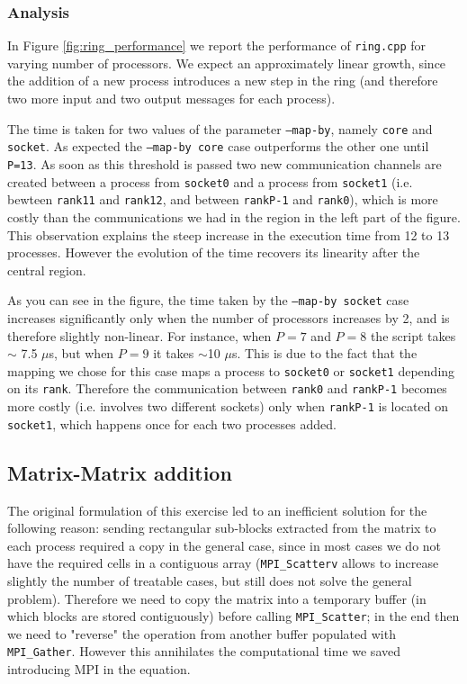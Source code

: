 \documentclass{article}
\begin{document}
\subsubsection{Analysis}
In Figure \ref{fig:ring_performance} we report the performance of \texttt{ring.cpp} for varying number of processors. We expect an approximately linear growth, since the addition of a new process introduces a new step in the ring (and therefore two more input and two output messages for each process).

The time is taken for two values of the parameter \texttt{--map-by}, namely \texttt{core} and \texttt{socket}. As expected the \texttt{--map-by core} case outperforms the other one until \texttt{P=13}. As soon as this threshold is passed two new communication channels are created between a process from \texttt{socket0} and a process from \texttt{socket1} (i.e. bewteen \texttt{rank11} and \texttt{rank12}, and between \texttt{rankP-1} and \texttt{rank0}), which is more costly than the communications we had in the region in the left part of the figure. This observation explains the steep increase in the execution time from 12 to 13 processes. However the evolution of the time recovers its linearity after the central region.

As you can see in the figure, the time taken by the \texttt{--map-by socket} case increases significantly only when the number of processors increases by 2, and is therefore slightly non-linear. For instance, when $P=7$ and $P=8$ the script takes $\sim$ 7.5 $\mu$s, but when $P=9$ it takes $\sim$10 $\mu$s. This is due to the fact that the mapping we chose for this case maps a process to \texttt{socket0} or \texttt{socket1} depending on its \texttt{rank}. Therefore the communication between \texttt{rank0} and \texttt{rankP-1} becomes more costly (i.e. involves two different sockets) only when \texttt{rankP-1} is located on \texttt{socket1}, which happens once for each two processes added.

\subsection{Matrix-Matrix addition}
The original formulation of this exercise led to an inefficient solution for the following reason: sending rectangular sub-blocks extracted from the matrix to each process required a copy in the general case, since in most cases we do not have the required cells in a contiguous array (\texttt{MPI\_Scatterv} allows to increase slightly the number of treatable cases, but still does not solve the general problem). Therefore we need to copy the matrix into a temporary buffer (in which blocks are stored contiguously) before calling \texttt{MPI\_Scatter}; in the end then we need to "reverse" the operation from another buffer populated with \texttt{MPI\_Gather}. However this annihilates the computational time we saved introducing MPI in the equation.
\end{document}
